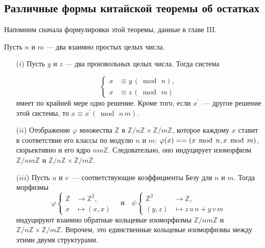\documentclass{../../template/mai_book}
\begin{document}
    \subsection{Различные формы китайской теоремы об остатках}
    \noindent Напомним сначала формулировки этой теоремы, данные в главе III.
    \begin{thm}
    \hspace*{0.5cm}
    Пусть $n$ и $m$ — два взаимно простых целых числа.
    \begin{itemize}
    \item[($i$)]Пусть $y$ и $z$ — два произвольных целых числа. Тогда система

    \[
    \left\{
    \begin{aligned}
    x &\equiv y \,(\bmod\,n),\\
    x &\equiv z \,(\bmod\,m)
    \end{aligned}
    \right.
    \]
    имеет по крайней мере одно решение. Кроме того, если $x^\prime$~— другое решение этой системы, то $x \equiv x^\prime (\bmod\,n\,m)$.

    \item[($ii$)] Отображение $\varphi$ множества $\mathbb{Z}$ в $\mathbb{Z}/n\mathbb{Z} \times \mathbb{Z}/m\mathbb{Z}$, которое каждому $x$ ставит в соответствие его классы по модулю $n$ и $m$: $\varphi (x) = \linebreak= (x\, \bmod\,n, x\,\bmod\,m)$, сюрьективно и его ядро $n m \mathbb{Z}$. Следовательно, оно индуцирует изоморфизм $\mathbb{Z}/nm\mathbb{Z}$ и $\mathbb{Z}/n\mathbb{Z} \times \mathbb{Z}/m\mathbb{Z}$.

    \item[($iii$)]Пусть $u$ и $v$~— соответствующие коэффициенты Безу для $n$ и $m$. Тогда морфизмы
    \[\varphi
    \left\{
    \begin{aligned}
    \mathbb{Z} &\to
    \mathbb{Z}^2,\\
    x &\mapsto (x, x)
    \end{aligned}
    \right. \quad \mathrm{и} \quad \psi\left\{
    \begin{aligned}
    \mathbb{Z}^2 &\to \mathbb{Z},\\
    (y, z) &\mapsto z\,u\,n + y\,v\,m
    \end{aligned}
    \right.
    \]
    индуцируют взаимно обратные кольцевые изоморфизмы $\mathbb{Z}/nm\mathbb{Z}$ и \linebreak $\mathbb{Z}/n\mathbb{Z} \times \mathbb{Z}/m\mathbb{Z}$. Впрочем, это единственные кольцевые изоморфизмы между этими двумя структурами.


\end{itemize}
\end{thm}
\end{document}
